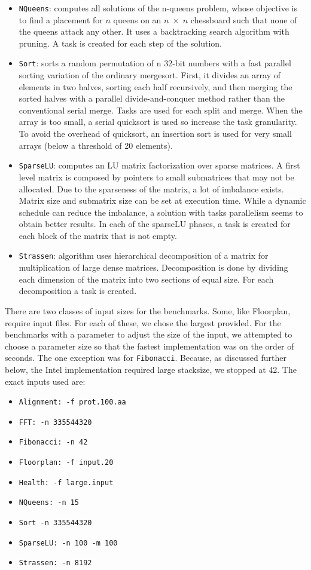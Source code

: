 \documentclass[sigconf]{acmart}
\begin{document}
\begin{itemize}
\item \texttt{NQueens}: computes  all  solutions  of  the n-queens
problem, whose objective is to find a placement for $n$ queens on an $n \;
\times \; n$ chessboard such that none of the queens attack any other. It uses
a backtracking search algorithm with pruning. A task is created for each step
of the solution.
\item \texttt{Sort}: sorts a random permutation of n 32-bit numbers with  a
fast  parallel  sorting  variation of  the  ordinary mergesort.  First, it
divides an array of elements in two halves, sorting  each half  recursively,
and  then  merging  the  sorted halves with a parallel divide-and-conquer
method rather than the  conventional  serial  merge.  Tasks are  used  for
each  split and merge. When the array is too small, a serial quicksort is used
so increase  the  task  granularity.  To  avoid  the overhead of  quicksort, an
insertion  sort  is  used  for  very  small  arrays (below a threshold of 20
elements).
\item \texttt{SparseLU}: computes an LU matrix factorization over
sparse matrices. A first level matrix is composed by pointers to  small
submatrices  that  may  not  be  allocated.  Due  to  the sparseness  of  the
matrix,  a  lot  of  imbalance  exists.  Matrix size and submatrix size can be
set at execution time. While a dynamic schedule can reduce the imbalance, a
solution with tasks parallelism seems to obtain better results. In each
of the sparseLU  phases,  a  task  is  created  for  each  block  of  the
matrix that is not empty.
\item \texttt{Strassen}: algorithm  uses  hierarchical  decomposition of a
matrix for multiplication of large dense matrices. Decomposition is done by
dividing each dimension of the matrix into  two  sections  of  equal size. For
each decomposition a task is created. 
\end{itemize}

There are two classes of input sizes for the benchmarks. Some, like Floorplan,
require input files. For each of these, we chose the largest provided. For the
benchmarks with a parameter to adjust the size of the input, we attempted to 
choose a parameter size so that the fastest implementation was on the order of
seconds. The one exception was for \texttt{Fibonacci}. Because, as discussed
further below, the Intel implementation required large stacksize, we stopped at
42. The exact inputs used are:

\begin{itemize}
\item \texttt{Alignment: -f prot.100.aa} 
\item \texttt{FFT: -n 335544320}
\item \texttt{Fibonacci: -n 42}
\item \texttt{Floorplan: -f input.20}
\item \texttt{Health: -f large.input}
\item \texttt{NQueens: -n 15}
\item \texttt{Sort -n 335544320}
\item \texttt{SparseLU: -n 100 -m 100}
\item \texttt{Strassen: -n 8192}
\end{itemize}
\end{document}
